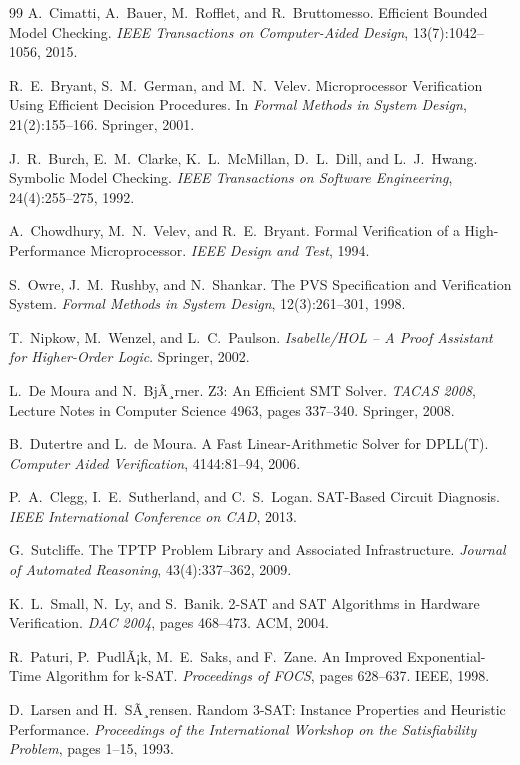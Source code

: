 ﻿\documentclass[a4paper,12pt]{article}
\theoremstyle{definition}
\begin{document}
\begin{thebibliography}{99}
A.\ Cimatti, A.\ Bauer, M.\ Rofflet, and R.\ Bruttomesso. Efficient Bounded Model Checking. \textit{IEEE Transactions on Computer-Aided Design}, 13(7):1042--1056, 2015.

R.\ E.\ Bryant, S.\ M.\ German, and M.\ N.\ Velev. Microprocessor Verification Using Efficient Decision Procedures. In \textit{Formal Methods in System Design}, 21(2):155--166. Springer, 2001.

J.\ R.\ Burch, E.\ M.\ Clarke, K.\ L.\ McMillan, D.\ L.\ Dill, and L.\ J.\ Hwang. Symbolic Model Checking. \textit{IEEE Transactions on Software Engineering}, 24(4):255--275, 1992.

A.\ Chowdhury, M.\ N.\ Velev, and R.\ E.\ Bryant. Formal Verification of a High-Performance Microprocessor. \textit{IEEE Design and Test}, 1994.

S.\ Owre, J.\ M.\ Rushby, and N.\ Shankar. The PVS Specification and Verification System. \textit{Formal Methods in System Design}, 12(3):261--301, 1998.

T.\ Nipkow, M.\ Wenzel, and L.\ C.\ Paulson. \textit{Isabelle/HOL -- A Proof Assistant for Higher-Order Logic}. Springer, 2002.

L.\ De Moura and N.\ BjÃ¸rner. Z3: An Efficient SMT Solver. \textit{TACAS 2008}, Lecture Notes in Computer Science 4963, pages 337--340. Springer, 2008.

B.\ Dutertre and L.\ de Moura. A Fast Linear-Arithmetic Solver for DPLL(T). \textit{Computer Aided Verification}, 4144:81--94, 2006.

P.\ A.\ Clegg, I.\ E.\ Sutherland, and C.\ S.\ Logan. SAT-Based Circuit Diagnosis. \textit{IEEE International Conference on CAD}, 2013.

G.\ Sutcliffe. The TPTP Problem Library and Associated Infrastructure. \textit{Journal of Automated Reasoning}, 43(4):337--362, 2009.

K.\ L.\ Small, N.\ Ly, and S.\ Banik. 2-SAT and SAT Algorithms in Hardware Verification. \textit{DAC 2004}, pages 468--473. ACM, 2004.

R.\ Paturi, P.\ PudlÃ¡k, M.\ E.\ Saks, and F.\ Zane. An Improved Exponential-Time Algorithm for k-SAT. \textit{Proceedings of FOCS}, pages 628--637. IEEE, 1998.

D.\ Larsen and H.\ SÃ¸rensen. Random 3-SAT: Instance Properties and Heuristic Performance. \textit{Proceedings of the International Workshop on the Satisfiability Problem}, pages 1--15, 1993.


\end{thebibliography}
\end{document}
